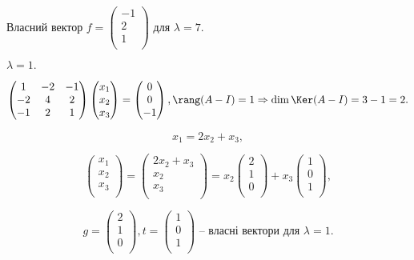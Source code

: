 Власний вектор $f = \begin{pmatrix}
	-1 \\
	2 \\
	1 \\
\end{pmatrix}$ для $\lambda = 7$.

$\lambda = 1.$

$$\begin{pmatrix}
	1 & -2 & -1 \\
	-2 & 4 & 2  \\
	-1 &  2 & 1 \\
\end{pmatrix} \begin{pmatrix}
	x_1 \\
	x_2 \\
	x_3 \\
\end{pmatrix} = \begin{pmatrix}
	0 \\
	0 \\
	-1 \\
\end{pmatrix}, \rang(A-I) = 1 \Rightarrow \dim \Ker(A-I) = 3 - 1 = 2.$$

$$x_1 = 2x_2 + x_3,$$

$$\begin{pmatrix}
	x_1 \\
	x_2 \\
	x_3 \\
\end{pmatrix} = \begin{pmatrix}
	2x_2 + x_3 \\
	x_2 \\
	x_3 \\
\end{pmatrix} = x_2 \begin{pmatrix}
	2 \\
	1 \\
	0 \\
\end{pmatrix} + x_3 \begin{pmatrix}
	1 \\
	0 \\
	1 \\
\end{pmatrix},$$

$$g = \begin{pmatrix}
	2 \\
	1 \\
	0 \\
\end{pmatrix}, t = \begin{pmatrix}
	1 \\
	0 \\
	1 \\
\end{pmatrix} \text{ -- власні вектори для } \lambda = 1.$$

